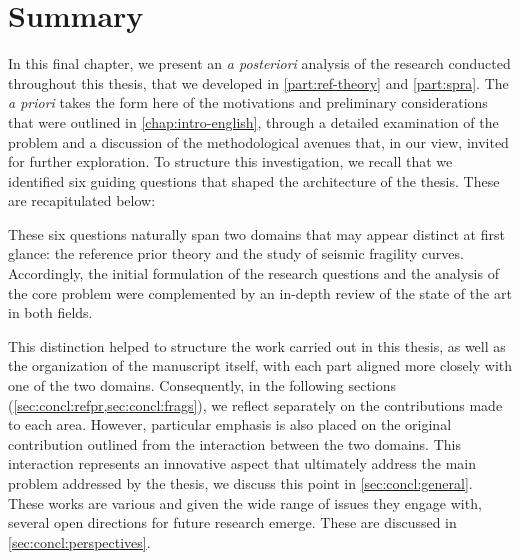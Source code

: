 \section{Summary}




In this final chapter, we present an \emph{a posteriori} analysis of the research conducted throughout this thesis, that we developed in \cref{part:ref-theory} and \cref{part:spra}. The \emph{a priori} takes the form here of the 
motivations and preliminary considerations that were outlined in \cref{chap:intro-english}, through a detailed examination of the problem and a discussion of the methodological avenues that, in our view, invited for further exploration.
To structure this investigation, we recall that we identified six guiding questions that shaped the architecture of the thesis. These are recapitulated below:\\[-5pt]










These six questions naturally span two domains that may appear distinct at first glance: the reference prior theory and the study of seismic fragility curves. Accordingly, the initial formulation of the research questions and the analysis of the core problem were complemented by an in-depth review of the state of the art in both fields.

This distinction helped to structure the work carried out in this thesis, as well as the organization of the manuscript itself, with each part aligned more closely with one of the two domains. Consequently, in the following sections (\cref{sec:concl:refpr,sec:concl:frags}), we reflect separately on the contributions made to each area. However, particular emphasis is also placed on the original contribution outlined from the interaction between the two domains. This interaction represents an innovative aspect that ultimately address the main problem addressed by the thesis, we discuss this point in \cref{sec:concl:general}.
These works are various and given the wide range of issues they engage with, several open directions for future research emerge. These are discussed in \cref{sec:concl:perspectives}.




